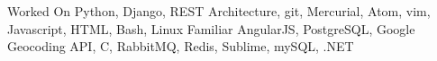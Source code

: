 \begin{cvskills}
  \cvskill
    {Worked On}
    {Python, Django, REST Architecture, git, Mercurial, Atom, vim, Javascript, HTML, Bash, Linux}
  \cvskill
    {Familiar}
    {AngularJS, PostgreSQL, Google Geocoding API, C, RabbitMQ, Redis, Sublime, mySQL, .NET}
\end{cvskills}
